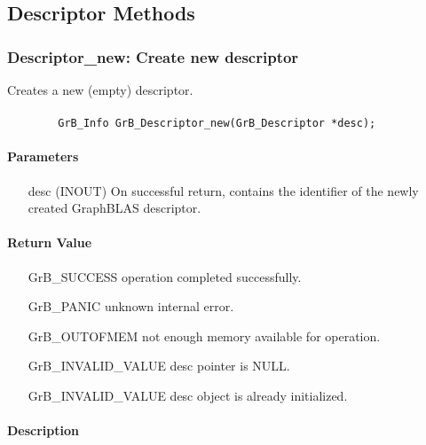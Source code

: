 \subsection{Descriptor Methods}

\subsubsection{{\sf Descriptor\_new}: Create new descriptor}

Creates a new (empty) descriptor.

\paragraph{\syntax}

\begin{verbatim}
        GrB_Info GrB_Descriptor_new(GrB_Descriptor *desc);
\end{verbatim}

\paragraph{Parameters}

\begin{itemize}[leftmargin=1.1in]
    \item[{\sf desc}] ({\sf INOUT}) On successful return, contains the 
    identifier of the newly created GraphBLAS descriptor.
\end{itemize}

\paragraph{Return Value}

\begin{itemize}[leftmargin=2.1in]
\item[{\sf GrB\_SUCCESS}]           operation completed successfully.
\item[{\sf GrB\_PANIC}]             unknown internal error.
\item[{\sf GrB\_OUTOFMEM}]          not enough memory available for operation.
\item[{\sf GrB\_INVALID\_VALUE}]    {\sf desc} pointer is {\sf NULL}.
\item[{\sf GrB\_INVALID\_VALUE}]    {\sf desc} object is already initialized.
\end{itemize}

\paragraph{Description}

